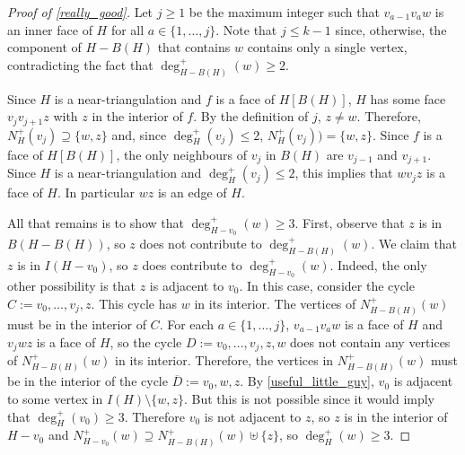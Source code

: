 \documentclass[a4paper,UKenglish,cleveref, autoref, thm-restate]{lipics-v2021}
\begin{document}
\begin{proof}[Proof of \cref{really_good}]
  Let $j\ge 1$ be the maximum integer such that $v_{a-1}v_{a}w$ is an inner face of $H$ for all $a\in\{1,\ldots,j\}$.  Note that $j\le k-1$ since, otherwise, the component of $H-B(H)$ that contains $w$ contains only a single vertex, contradicting the fact that $\deg^+_{H-B(H)}(w)\ge 2$.

  Since $H$ is a near-triangulation and $f$ is a face of $H[B(H)]$, $H$ has some face $v_j v_{j+1} z$ with $z$ in the interior of $f$.  By the definition of $j$, $z\neq w$.  Therefore, $N_H^+(v_j)\supseteq \{w,z\}$ and, since $\deg^+_H(v_j)\le 2$, $N_H^+(v_j))= \{w,z\}$.
  Since $f$ is a face of $H[B(H)]$, the only neighbours of $v_j$ in $B(H)$ are $v_{j-1}$ and $v_{j+1}$. Since $H$ is a near-triangulation and $\deg^+_H(v_j)\le 2$, this implies that $w v_j z$ is a face of $H$.  In particular $wz$ is an edge of $H$.

  All that remains is to show that $\deg^+_{H-v_0}(w)\ge 3$.  First, observe that $z$ is in $B(H-B(H))$, so $z$ does not contribute to $\deg^+_{H-B(H)}(w)$. We claim that $z$ is in $I(H-v_0)$, so $z$ does contribute to $\deg^+_{H-v_0}(w)$.   Indeed, the only other possibility is that $z$ is adjacent to $v_0$.  In this case, consider the cycle $C:=v_0,\ldots,v_j,z$.  This cycle has $w$ in its interior. The vertices of $N^+_{H-B(H)}(w)$ must be in the interior of $C$. For each $a\in\{1,\ldots,j\}$, $v_{a-1}v_a w$ is a face of $H$ and $v_jwz$ is a face of $H$, so the cycle $D:=v_0,\ldots,v_j,z,w$ does not contain any vertices of $N^+_{H-B(H)}(w)$ in its interior.  Therefore, the vertices in $N^+_{H-B(H)}(w)$ must be in the interior of the cycle $\overline{D}:=v_0,w,z$.  By \cref{useful_little_guy}, $v_0$ is adjacent to some vertex in $I(H)\setminus\{w,z\}$. But this is not possible since it would imply that $\deg^+_H(v_0)\ge 3$.  Therefore $v_0$ is not adjacent to $z$, so $z$ is in the interior of $H-v_0$ and $N^+_{H-v_0}(w)\supseteq N^+_{H-B(H)}(w)\uplus\{z\}$, so $\deg^+_H(w)\ge 3$.
\end{proof}
\end{document}
